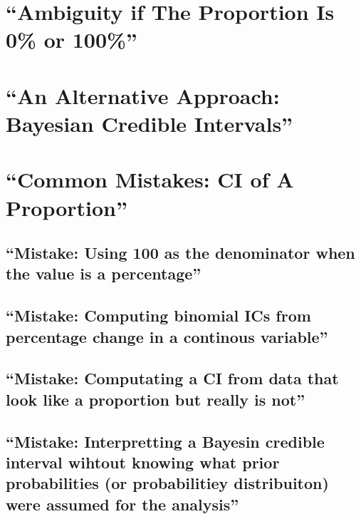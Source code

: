 \documentclass[]{book}
\theoremstyle{definition}
\theoremstyle{definition}
\theoremstyle{definition}
\theoremstyle{remark}
\begin{document}
\section{\texorpdfstring{``Ambiguity if The Proportion Is 0\% or
100\%''}{Ambiguity if The Proportion Is 0\% or 100\%}}\label{ambiguity-if-the-proportion-is-0-or-100}

\section{\texorpdfstring{``An Alternative Approach: Bayesian Credible
Intervals''}{An Alternative Approach: Bayesian Credible Intervals}}\label{an-alternative-approach-bayesian-credible-intervals}

\section{\texorpdfstring{``Common Mistakes: CI of A
Proportion''}{Common Mistakes: CI of A Proportion}}\label{common-mistakes-ci-of-a-proportion}

\subsection{\texorpdfstring{``Mistake: Using 100 as the denominator when
the value is a
percentage''}{Mistake: Using 100 as the denominator when the value is a percentage}}\label{mistake-using-100-as-the-denominator-when-the-value-is-a-percentage}

\subsection{\texorpdfstring{``Mistake: Computing binomial ICs from
percentage change in a continous
variable''}{Mistake: Computing binomial ICs from percentage change in a continous variable}}\label{mistake-computing-binomial-ics-from-percentage-change-in-a-continous-variable}

\subsection{\texorpdfstring{``Mistake: Computating a CI from data that
look like a proportion but really is
not''}{Mistake: Computating a CI from data that look like a proportion but really is not}}\label{mistake-computating-a-ci-from-data-that-look-like-a-proportion-but-really-is-not}

\subsection{\texorpdfstring{``Mistake: Interpretting a Bayesin credible
interval wihtout knowing what prior probabilities (or probabilitiey
distribuiton) were assumed for the
analysis''}{Mistake: Interpretting a Bayesin credible interval wihtout knowing what prior probabilities (or probabilitiey distribuiton) were assumed for the analysis}}\label{mistake-interpretting-a-bayesin-credible-interval-wihtout-knowing-what-prior-probabilities-or-probabilitiey-distribuiton-were-assumed-for-the-analysis}
\end{document}

